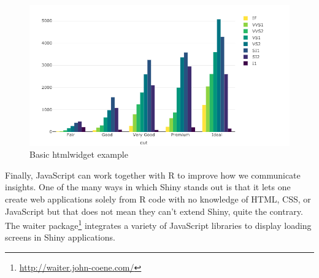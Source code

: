 \documentclass[
  10pt,
]{krantz}
\makeatletter
\newenvironment{Shaded}{\begin{snugshade}}{\end{snugshade}}
\newcommand{\CommentTok}[1]{\textcolor[rgb]{0.37,0.37,0.37}{\textit{#1}}}
\newcommand{\ControlFlowTok}[1]{\textcolor[rgb]{0.27,0.27,0.27}{\textbf{#1}}}
\newcommand{\DecValTok}[1]{\textcolor[rgb]{0.06,0.06,0.06}{#1}}
\newcommand{\KeywordTok}[1]{\textcolor[rgb]{0.27,0.27,0.27}{\textbf{#1}}}
\newcommand{\NormalTok}[1]{#1}
\newcommand{\OperatorTok}[1]{\textcolor[rgb]{0.43,0.43,0.43}{\textbf{#1}}}
\newcommand{\StringTok}[1]{\textcolor[rgb]{0.5,0.5,0.5}{#1}}
\renewcommand{\href}[2]{#2\footnote{\url{#1}}}
\newenvironment{kframe}{%
\medskip{}
\setlength{\fboxsep}{.8em}
 \def\at@end@of@kframe{}%
 \ifinner\ifhmode%
  \def\at@end@of@kframe{\end{minipage}}%
  \begin{minipage}{\columnwidth}%
 \fi\fi%
 \def\FrameCommand##1{\hskip\@totalleftmargin \hskip-\fboxsep
 \colorbox{shadecolor}{##1}\hskip-\fboxsep
     \hskip-\linewidth \hskip-\@totalleftmargin \hskip\columnwidth}%
 \MakeFramed {\advance\hsize-\width
   \@totalleftmargin\z@ \linewidth\hsize
   \@setminipage}}%
 {\par\unskip\endMakeFramed%
 \at@end@of@kframe}
\renewenvironment{Shaded}{\begin{kframe}}{\end{kframe}}
\makeatother
\begin{document}
\begin{figure}[H]

{\centering \includegraphics[width=1\linewidth]{images/01-plotly} 

}

\caption{Basic htmlwidget example}\label{fig:plotly-basic-example}
\end{figure}

Finally, JavaScript can work together with R to improve how we communicate insights. One of the many ways in which Shiny stands out is that it lets one create web applications solely from R code with no knowledge of HTML, CSS, or JavaScript but that does not mean they can't extend Shiny, quite the contrary. The \href{http://waiter.john-coene.com/}{waiter package} \citep{R-waiter} integrates a variety of JavaScript libraries to display loading screens in Shiny applications.

\begin{Shaded}
\end{Shaded}
\end{document}
